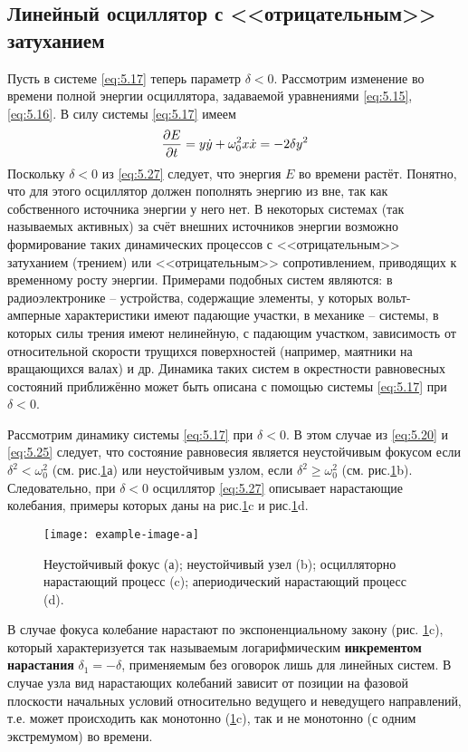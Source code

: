 \subsection{Линейный осциллятор с <<отрицательным>> затуханием}%
\label{sub:5.1.3}

Пусть в системе \eqref{eq:5.17} теперь параметр $\delta<0$. Рассмотрим изменение во времени полной энергии осциллятора, задаваемой уравнениями \eqref{eq:5.15}, \eqref{eq:5.16}. В силу системы \eqref{eq:5.17} имеем
\begin{equation}
        \label{eq:5.27}
        \pdv{E}{t} = y \dot y + \omega_0^2 x \dot x = - 2\delta y^2
\end{equation}
Поскольку $\delta<0$ из \eqref{eq:5.27} следует, что энергия $E$ во времени растёт. Понятно, что для этого осциллятор должен пополнять энергию из вне, так как собственного источника энергии у него нет. В некоторых системах (так называемых активных) за счёт внешних источников энергии возможно формирование таких динамических процессов с <<отрицательным>> затуханием (трением) или <<отрицательным>> сопротивлением, приводящих к временному росту энергии.
Примерами подобных систем являются: в радиоэлектронике -- устройства,
содержащие элементы, у которых вольт-амперные характеристики имеют
падающие участки, в механике --  системы, в которых силы трения имеют
нелинейную, с падающим участком, зависимость от относительной скорости
трущихся поверхностей (например, маятники на вращающихся валах) и др.
Динамика таких систем в окрестности равновесных состояний приближённо
может быть описана с помощью системы \eqref{eq:5.17} при $\delta<0$.

Рассмотрим динамику системы \eqref{eq:5.17} при $\delta<0$. В этом случае из \eqref{eq:5.20} и \eqref{eq:5.25} следует, что состояние равновесия является неустойчивым фокусом если $\delta^2<\omega_0^2$ (см. рис.\ref{fig:5.6}а) или неустойчивым узлом, если $\delta^2 \geq \omega_0^2$ (см. рис.\ref{fig:5.6}b). Следовательно, при $\delta<0$ осциллятор \eqref{eq:5.27} описывает нарастающие колебания,
примеры которых даны на рис.\ref{fig:5.6}c и рис.\ref{fig:5.6}d. 
\begin{figure}[h]
        \centering
        \texttt{[image: example-image-a]}
        \caption{Неустойчивый фокус (а); неустойчивый узел (b); осцилляторно нарастающий процесс (c); апериодический нарастающий процесс (d).}
        \label{fig:5.6}
\end{figure}
В случае фокуса колебание
нарастают по экспоненциальному закону (рис. \ref{fig:5.6}c), который характеризуется
так называемым логарифмическим \textbf{инкрементом нарастания}
$\delta_1= -\delta$,
применяемым без оговорок лишь для линейных систем. В случае узла вид
нарастающих колебаний зависит от позиции на фазовой плоскости начальных
условий относительно ведущего и неведущего направлений, т.е. может
происходить как монотонно (\ref{fig:5.6}c), так и не монотонно (с одним
экстремумом) во времени.


